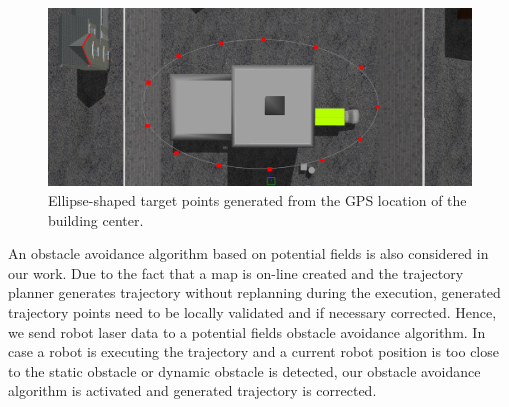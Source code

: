 \begin{figure}[t!]
	\centering
	\includegraphics[width=1.0\columnwidth]{./pictures/building.png}	
	\caption{Ellipse-shaped target points generated from the GPS location of the building center.}
	\label{fig:building}
\end{figure}

An obstacle avoidance algorithm based on potential fields is also considered in our work. Due to the fact that a map is on-line created and the trajectory planner generates trajectory without replanning during the execution, generated trajectory points need to be locally validated and if necessary corrected. Hence, we send robot laser data to a potential fields obstacle avoidance algorithm. In case a robot is executing the trajectory and a current robot position is too close to the static obstacle or dynamic obstacle is detected, our obstacle avoidance algorithm is activated and generated trajectory is corrected.  


